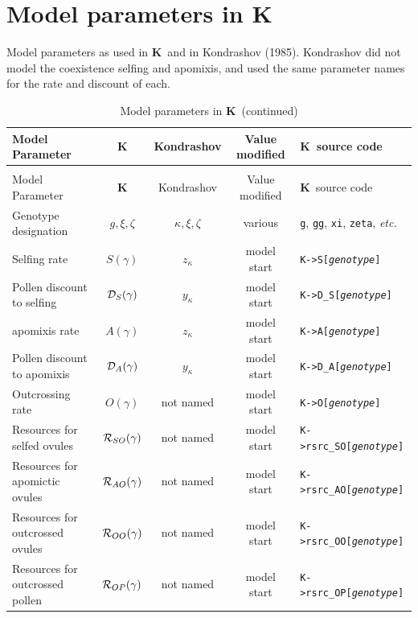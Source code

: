 \documentclass[12pt,twoside,letterpaper,fleqn]{report}
\numberwithin{equation}{section}  %
\newcommand{\K}{{\bf K}}
\newcommand{\Kmemberi}[2]{\mbox{{\tt K->#1[{\it #2}\/]}}}
\newcommand{\Sg}{\mbox{$S(\gamma)$}}
\newcommand{\DSg}{\mbox{${\cal D}_{S}(\gamma)$}}
\newcommand{\Ag}{\mbox{$A(\gamma)$}}
\newcommand{\DAg}{\mbox{${\cal D}_{A}(\gamma)$}}
\newcommand{\Og}{\mbox{$O(\gamma)$}}
\newcommand{\RSOg}{\mbox{${\cal R}_{SO}(\gamma)$}}
\newcommand{\RAOg}{\mbox{${\cal R}_{AO}(\gamma)$}}
\newcommand{\ROOg}{\mbox{${\cal R}_{OO}(\gamma)$}}
\newcommand{\ROPg}{\mbox{${\cal R}_{OP}(\gamma)$}}
\begin{document}
{\chapter{Model parameters in \K}

Model parameters as used in \K\ and in Kondrashov (1985).  \dag\/Kondrashov did
not model the coexistence selfing and apomixis, and used the same parameter
names for the rate and discount of each.

\begin{landscape}

\label{tab:modelparameters}
\begin{longtable}{p{2in}|c|c|c|l}
\caption{Model parameters in \K} \\
Model Parameter			        &	\K              	&	Kondrashov		& Value modified & \K\ source code       \\ \hline
\endfirsthead
\caption{Model parameters in \K\ (continued)} \\
Model Parameter			        &	\K              	&	Kondrashov		& Value modified & \K\ source code       \\ \hline
\endhead
Genotype designation	      & $g, \xi, \zeta$	& $\kappa, \xi, \zeta$	& various & {\tt g}, {\tt gg}, {\tt xi}, {\tt zeta}, {\em etc.} \\
Selfing rate								& \Sg							& $z_\kappa$		& model start &	\Kmemberi{S}{genotype}   \\
Pollen discount to selfing	& \DSg						& $y_\kappa$		& model start &  \Kmemberi{D\_S}{genotype} \\
apomixis rate								& \Ag							& $z_\kappa$\dag 	&	model start & \Kmemberi{A}{genotype}   \\
Pollen discount to apomixis	& \DAg						& $y_\kappa$\dag	& model start & \Kmemberi{D\_A}{genotype} \\
Outcrossing rate						& \Og							& not named   	&	model start &	\Kmemberi{O}{genotype} \\
Resources for selfed ovules & \RSOg           & not named			& model start &	\Kmemberi{rsrc\_SO}{genotype} \\
Resources for apomictic ovules & \RAOg        & not named			& model start &	\Kmemberi{rsrc\_AO}{genotype} \\
Resources for outcrossed ovules & \ROOg       & not named			& model start &	\Kmemberi{rsrc\_OO}{genotype} \\
Resources for outcrossed pollen & \ROPg       & not named			& model start &	\Kmemberi{rsrc\_OP}{genotype} \\

\end{longtable}
\end{landscape}}
\end{document}
